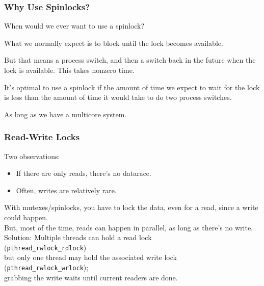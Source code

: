 \begin{frame}
\frametitle{Why Use Spinlocks?}

When would we ever want to use a spinlock?

What we normally expect is to block until the lock becomes available. 

But that means a process switch, and then a switch back in the future when the lock is available.  This takes nonzero time. 

It's optimal to use a spinlock if the amount of time we expect to wait for the lock is less than the amount of time it would take to do two process switches. 

As long as we have a multicore system.

\end{frame}


\begin{frame}
  \frametitle{Read-Write Locks}

  Two observations:
  \begin{itemize}
    \item If there are only reads, there's no datarace.
    \item Often, writes are relatively rare.
  \end{itemize}
  With mutexes/spinlocks, you have to lock the data, even for a read,
      since a write could happen.\\[1em]

  But, most of the time, reads can happen in parallel, as long as
      there's no write.\\[1em]

  Solution: Multiple threads can hold a read lock\\ \hspace*{2em} ({\tt pthread\_rwlock\_rdlock})\\
      but only one thread may hold the associated write lock\\ \hspace*{2em} ({\tt pthread\_rwlock\_wrlock});\\
      grabbing the write waits until  current readers are done.
\end{frame}

